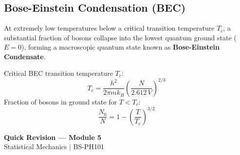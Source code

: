 \documentclass[12pt,a4paper]{article}
\begin{document}
\subsection{Bose-Einstein Condensation (BEC)}

At extremely low temperatures below a critical transition temperature $T_c$, a substantial fraction of bosons collapse into the lowest quantum ground state ($E=0$), forming a macroscopic quantum state known as \textbf{Bose-Einstein Condensate}.

\begin{tcolorbox}[formulabox, title={\textbf{Critical Temperature and Ground State Fraction}}]
Critical BEC transition temperature $T_c$:
\begin{equation}
T_c = \frac{h^2}{2\pi m k_B} \left( \frac{N}{2.612 \, V} \right)^{2/3}
\end{equation}
Fraction of bosons in ground state for $T < T_c$:
\begin{equation}
\frac{N_0}{N} = 1 - \left(\frac{T}{T_c}\right)^{3/2}
\end{equation}
\end{tcolorbox}

\newpage
\begin{center}
  {\large\bfseries\color{myred} Quick Revision --- Module 5}\\[3pt]
  {\small\color{mydark} Statistical Mechanics $|$ BS-PH101}
\end{center}
\noindent{\color{myred}\rule{\linewidth}{1.2pt}}
\vspace{4pt}
\end{document}
